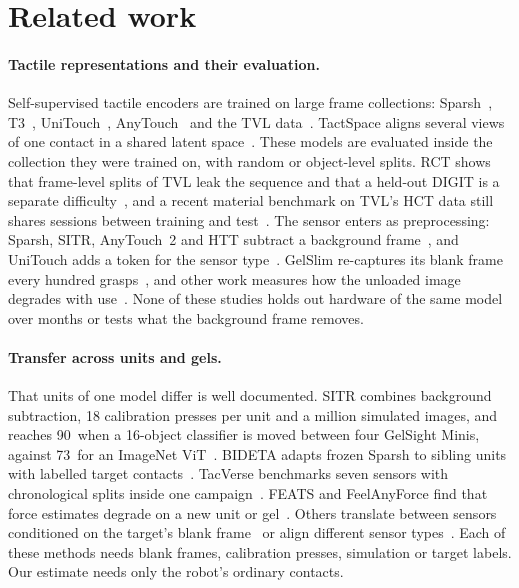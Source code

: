 \section{Related work}
\label{sec:related}

\paragraph{Tactile representations and their evaluation.}
Self-supervised tactile encoders are trained on large frame collections: Sparsh~\cite{higuera2024sparsh}, T3~\cite{t3fota2024}, UniTouch~\cite{unitouch2024}, AnyTouch~\cite{anytouch2025,anytouch2026two} and the TVL data~\cite{tvl2024}. TactSpace aligns several views of one contact in a shared latent space~\cite{tactspace2026}. These models are evaluated inside the collection they were trained on, with random or object-level splits. RCT shows that frame-level splits of TVL leak the sequence and that a held-out DIGIT is a separate difficulty~\cite{rct2026}, and a recent material benchmark on TVL's HCT data still shares sessions between training and test~\cite{mohsan2026language}. The sensor enters as preprocessing: Sparsh, SITR, AnyTouch~2 and HTT subtract a background frame~\cite{higuera2024sparsh,sitr2025,anytouch2026two,htt2026}, and UniTouch adds a token for the sensor type~\cite{unitouch2024}. GelSlim re-captures its blank frame every hundred grasps~\cite{gelslim2018}, and other work measures how the unloaded image degrades with use~\cite{davis2025resilience,cottrell2026durable}. None of these studies holds out hardware of the same model over months or tests what the background frame removes.

\paragraph{Transfer across units and gels.}
That units of one model differ is well documented. SITR combines background subtraction, 18 calibration presses per unit and a million simulated images, and reaches 90\pct\ when a 16-object classifier is moved between four GelSight Minis, against 73\pct\ for an ImageNet ViT~\cite{sitr2025}. BIDETA adapts frozen Sparsh to sibling units with labelled target contacts~\cite{bideta2026}. TacVerse benchmarks seven sensors with chronological splits inside one campaign~\cite{tacverse2026}. FEATS and FeelAnyForce find that force estimates degrade on a new unit or gel~\cite{feats2025,feelanyforce2024}. Others translate between sensors conditioned on the target's blank frame~\cite{genforce2026,castano2026forcemap,split2026} or align different sensor types~\cite{cttp2024,htt2026}. Each of these methods needs blank frames, calibration presses, simulation or target labels. Our estimate needs only the robot's ordinary contacts.

